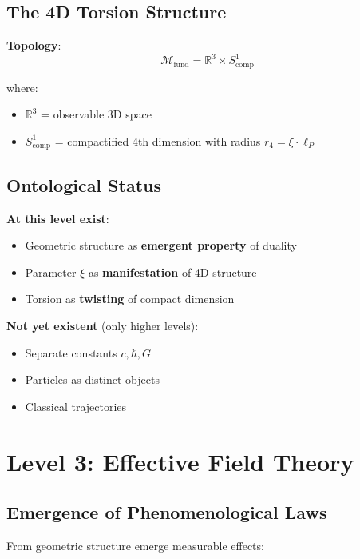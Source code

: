 	\subsection{The 4D Torsion Structure}
	
	\textbf{Topology}:
	\begin{equation}
		\mathcal{M}_{\text{fund}} = \mathbb{R}^3 \times S^1_{\text{comp}}
	\end{equation}
	
	where:
	\begin{itemize}
		\item $\mathbb{R}^3$ = observable 3D space
		\item $S^1_{\text{comp}}$ = compactified 4th dimension with radius $r_4 = \xi \cdot \ell_P$
	\end{itemize}
	
	\subsection{Ontological Status}
	
	\textbf{At this level exist}:
	\begin{itemize}
		\item Geometric structure as \textbf{emergent property} of duality
		\item Parameter $\xi$ as \textbf{manifestation} of 4D structure
		\item Torsion as \textbf{twisting} of compact dimension
	\end{itemize}
	
	\textbf{Not yet existent} (only higher levels):
	\begin{itemize}
		\item Separate constants $c, \hbar, G$
		\item Particles as distinct objects
		\item Classical trajectories
	\end{itemize}
	
	\section{Level 3: Effective Field Theory}
	
	\subsection{Emergence of Phenomenological Laws}
	
	From geometric structure emerge measurable effects:
	

